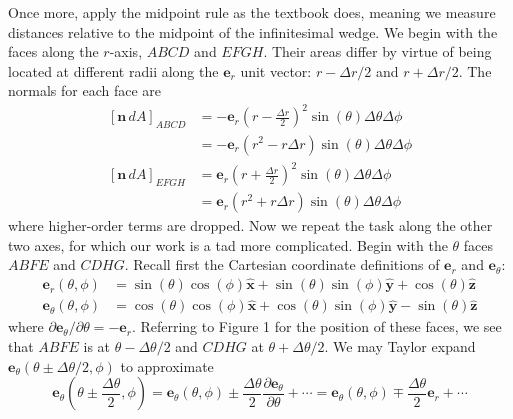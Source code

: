 \documentclass[a4paper]{article}
\begin{document}
Once more, apply the midpoint rule as the textbook does, meaning we measure distances relative to the midpoint of the infinitesimal wedge. We begin with the faces along the \( r \)-axis, \( ABCD \) and \( EFGH \). Their areas differ by virtue of being located at different radii along the \( \pmb{e}_{r} \) unit vector: \( r - \Delta r / 2 \) and \( r + \Delta r / 2 \). The normals for each face are
\begin{align*}
	\!\left[ \pmb{n} \, dA \right]_{ABCD} & = -\pmb{e}_{r}\!\left( r - \frac{\Delta r}{2} \right)^{2}\sin\!\left(\theta\right)\Delta \theta \Delta \phi \\
					      & = \boxed{-\pmb{e}_{r} \!\left( r^{2} - r \Delta r \right)\sin\!\left(\theta\right) \Delta \theta \Delta \phi} \\
	\!\left[ \pmb{n} \, dA \right]_{EFGH} & = \pmb{e}_{r}\!\left( r + \frac{\Delta r}{2} \right)^{2}\sin\!\left(\theta\right)\Delta \theta \Delta \phi \\
					      & = \boxed{\pmb{e}_{r}\!\left( r^{2} + r \Delta r \right)\sin\!\left(\theta\right)\Delta \theta \Delta \phi}
\end{align*}
where higher-order terms are dropped. Now we repeat the task along the other two axes, for which our work is a tad more complicated. Begin with the \( \theta \) faces \( ABFE \) and \( CDHG \). Recall first the Cartesian coordinate definitions of \( \pmb{e}_{r} \) and \( \pmb{e}_{\theta} \):
\begin{align*}
	\pmb{e}_{r}\!\left( \theta,\phi \right) & = \sin\!\left(\theta\right)\cos\!\left(\phi\right)\pmb{\hat{x}} + \sin\!\left(\theta\right)\sin\!\left(\phi\right)\pmb{\hat{y}} + \cos\!\left(\theta\right)\pmb{\hat{z}} \\
	\pmb{e}_{\theta}\!\left( \theta,\phi \right) & = \cos\!\left(\theta\right)\cos\!\left(\phi\right)\pmb{\hat{x}} + \cos\!\left(\theta\right)\sin\!\left(\phi\right)\pmb{\hat{y}} - \sin\!\left(\theta\right)\pmb{\hat{z}}
\end{align*}
where \( \partial \pmb{e}_{\theta} / \partial \theta = -\pmb{e}_{r} \). Referring to Figure 1 for the position of these faces, we see that \( ABFE \) is at \( \theta - \Delta \theta / 2 \) and \( CDHG \) at \( \theta + \Delta \theta / 2 \). We may Taylor expand \( \pmb{e}_{\theta}\!\left( \theta \pm \Delta \theta / 2,\phi \right) \) to approximate
\[
	\pmb{e}_{\theta}\!\left( \theta \pm \frac{\Delta \theta}{2},\phi \right) = \pmb{e}_{\theta}\!\left( \theta,\phi \right) \pm \frac{\Delta \theta}{2}\frac{\partial \pmb{e}_{\theta}}{\partial \theta} + \cdots = \pmb{e}_{\theta}\!\left( \theta,\phi \right) \mp \frac{\Delta \theta}{2}\pmb{e}_{r} + \cdots
\]
\end{document}
